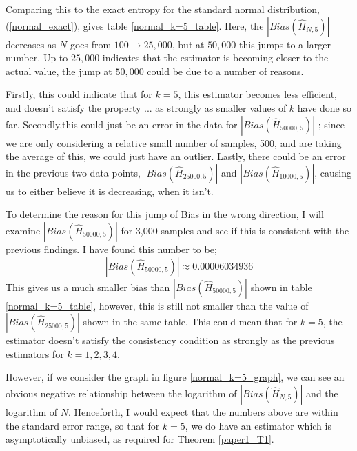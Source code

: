 \documentclass{article}
\begin{document}
Comparing this to the exact entropy for the standard normal distribution, (\ref{normal_exact}), gives table \ref{normal_k=5_table}. Here, the $|Bias(\hat{H}_{N, 5})|$ decreases as $N$ goes from $100 \to 25,000$, but at $50,000$ this jumps to a larger number. Up to $25,000$ indicates that the estimator is becoming closer to the actual value, the jump at $50,000$  could be due to a number of reasons. 

Firstly, this could indicate that for $k=5$, this estimator becomes less efficient, and doesn't satisfy the property ...  as strongly as smaller values of $k$ have done so far. Secondly,this could just be an error in the data for $|Bias(\hat{H}_{50000, 5})|$ ; since we are only considering a relative small number of samples, 500, and are taking the average of this, we could just have an outlier. Lastly, there could be an error in the previous two data points, $|Bias(\hat{H}_{25000, 5})|$ and $|Bias(\hat{H}_{10000, 5})|$, causing us to either believe it is decreasing, when it isn't.

To determine the reason for this jump of Bias in the wrong direction, I will examine $|Bias(\hat{H}_{50000, 5})|$ for 3,000 samples and see if this is consistent with the previous findings. I have found this number to be; 
\begin{equation} 
|Bias(\hat{H}_{50000, 5})|  \approx 0.00006034936 \nonumber
\end{equation}
This gives us a much smaller bias than $|Bias(\hat{H}_{50000, 5})|$ shown in table \ref{normal_k=5_table}, however, this is still not smaller than the value of $|Bias(\hat{H}_{25000, 5})|$ shown in the same table. This could mean that for $k=5$, the estimator doesn't satisfy the consistency condition as strongly as the previous estimators for $k=1, 2, 3, 4$.

However, if we consider the graph in figure \ref{normal_k=5_graph}, we can see an obvious negative relationship between the logarithm of $|Bias(\hat{H}_{N, 5})|$ and the logarithm of $N$. Henceforth, I would expect that the numbers above are within the standard error range, so that for $k=5$, we do have an estimator which is asymptotically unbiased, as required for Theorem \ref{paper1_T1}.
\end{document}
